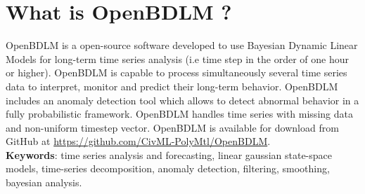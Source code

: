 \section{What is OpenBDLM ?}
\label{S:OPENBDLMWHATIS}

OpenBDLM is a \MATLAB{} open-source software developed to use Bayesian Dynamic Linear Models for long-term time series analysis (i.e time step in the order of one hour or higher).
OpenBDLM is capable to process simultaneously several time series data to interpret, monitor and predict their long-term behavior.
OpenBDLM includes an anomaly detection tool which allows to detect abnormal behavior in a fully probabilistic framework.
OpenBDLM handles time series with missing data and non-uniform timestep vector.
OpenBDLM is available for download from GitHub at \url{https://github.com/CivML-PolyMtl/OpenBDLM}.\\

\noindent \textbf{Keywords}: time series analysis and forecasting, linear gaussian state-space models, time-series decomposition, anomaly detection, filtering, smoothing, bayesian analysis.